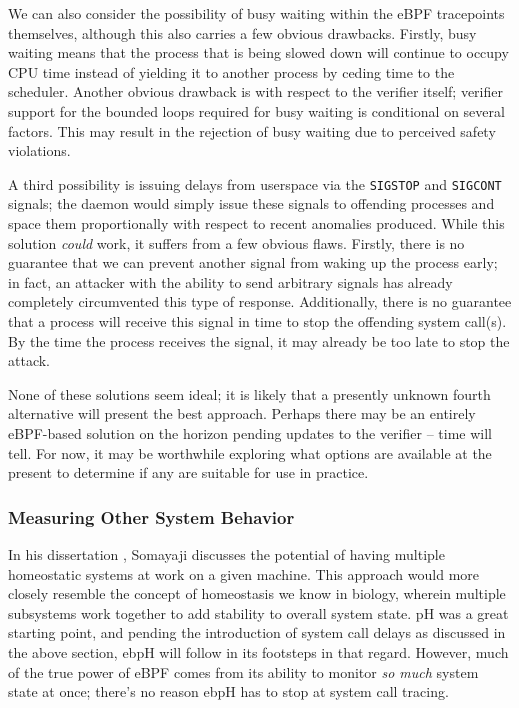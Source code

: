 \documentclass[
  12pt]{findlay}
\begin{document}
We can also consider the possibility of busy waiting within the eBPF
tracepoints themselves, although this also carries a few obvious
drawbacks. Firstly, busy waiting means that the process that is being
slowed down will continue to occupy CPU time instead of yielding it to
another process by ceding time to the scheduler. Another obvious
drawback is with respect to the verifier itself; verifier support for
the bounded loops required for busy waiting is conditional on several
factors. This may result in the rejection of busy waiting due to
perceived safety violations.

A third possibility is issuing delays from userspace via the
\passthrough{\lstinline!SIGSTOP!} and \passthrough{\lstinline!SIGCONT!}
signals; the daemon would simply issue these signals to offending
processes and space them proportionally with respect to recent anomalies
produced. While this solution \emph{could} work, it suffers from a few
obvious flaws. Firstly, there is no guarantee that we can prevent
another signal from waking up the process early; in fact, an attacker
with the ability to send arbitrary signals has already completely
circumvented this type of response. Additionally, there is no guarantee
that a process will receive this signal in time to stop the offending
system call(s). By the time the process receives the signal, it may
already be too late to stop the attack.

None of these solutions seem ideal; it is likely that a presently
unknown fourth alternative will present the best approach. Perhaps there
may be an entirely eBPF-based solution on the horizon pending updates to
the verifier -- time will tell. For now, it may be worthwhile exploring
what options are available at the present to determine if any are
suitable for use in practice.

\hypertarget{measuring-other-system-behavior}{%
\subsubsection{Measuring Other System
Behavior}\label{measuring-other-system-behavior}}

In his dissertation \autocite{soma02}, Somayaji discusses the potential
of having multiple homeostatic systems at work on a given machine. This
approach would more closely resemble the concept of homeostasis we know
in biology, wherein multiple subsystems work together to add stability
to overall system state. pH was a great starting point, and pending the
introduction of system call delays as discussed in the above section,
ebpH will follow in its footsteps in that regard. However, much of the
true power of eBPF comes from its ability to monitor \emph{so much}
system state at once; there's no reason ebpH has to stop at system call
tracing.
\end{document}
